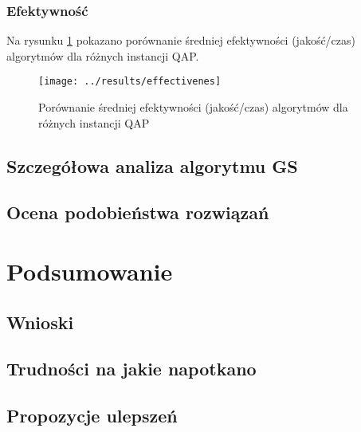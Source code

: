 \documentclass{article}
\begin{document}
		\subsubsection{Efektywność}Na rysunku \ref{fig:effectivenes} pokazano porównanie średniej efektywności (jakość/czas) algorytmów dla różnych instancji QAP.
			\begin{figure}[h]
				\texttt{[image: ../results/effectivenes]}
				\caption{Porównanie średniej efektywności (jakość/czas) algorytmów dla różnych instancji QAP\label{fig:effectivenes}}
			\end{figure}


	\subsection{Szczegółowa analiza algorytmu GS}
	\subsection{Ocena podobieństwa rozwiązań}
\section{Podsumowanie}
	\subsection{Wnioski}
	\subsection{Trudności na jakie napotkano}
	\subsection{Propozycje ulepszeń}




\end{document}
